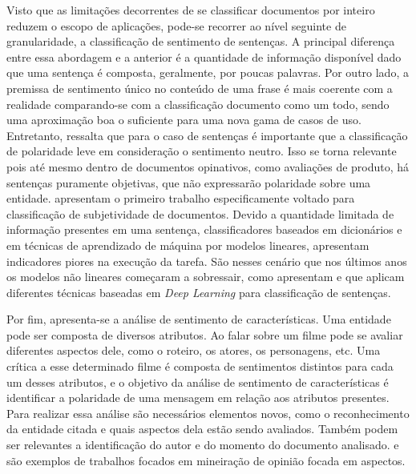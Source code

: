 Visto que as limitações decorrentes de se classificar documentos por inteiro
reduzem o escopo de aplicações, pode-se recorrer ao nível seguinte de
granularidade, a classificação de sentimento de sentenças.
A principal diferença entre essa abordagem e a anterior é a quantidade de
informação disponível dado que uma sentença é composta, geralmente, por poucas
palavras.
Por outro lado, a premissa de sentimento único no conteúdo de uma frase é mais
coerente com a realidade comparando-se com a classificação documento como um
todo, sendo uma aproximação boa o suficiente para uma nova gama de casos de uso.
Entretanto, \citet{liu15} ressalta que para o caso de sentenças é importante que
a classificação de polaridade leve em consideração o sentimento neutro.
Isso se torna relevante pois até mesmo dentro de documentos opinativos, como
avaliações de produto, há sentenças puramente objetivas, que não expressarão
polaridade sobre uma entidade.
\citet{riloff05} apresentam o primeiro trabalho especificamente voltado para
classificação de subjetividade de documentos.
Devido a quantidade limitada de informação presentes em uma sentença,
classificadores baseados em dicionários e em técnicas de aprendizado de máquina
por modelos lineares, apresentam indicadores piores na execução da tarefa.
São nesses cenário que nos últimos anos os modelos não lineares começaram a
sobressair, como apresentam \citet{socher11} e \citet{socher13} que aplicam
diferentes técnicas baseadas em \textit{Deep Learning} para classificação de
sentenças.

Por fim, apresenta-se a análise de sentimento de características.
Uma entidade pode ser composta de diversos atributos.
Ao falar sobre um filme pode se avaliar diferentes aspectos dele, como
o roteiro, os atores, os personagens, etc.
Uma crítica a esse determinado filme é composta de sentimentos distintos para
cada um desses atributos, e o objetivo da análise de sentimento de
características é identificar a polaridade de uma mensagem em relação aos
atributos presentes.
Para realizar essa análise são necessários elementos novos, como o reconhecimento
da entidade citada e quais aspectos dela estão sendo avaliados.
Também podem ser relevantes a identificação do autor e do momento do documento
analisado.
\citet{nasukawa03} e \citet{snyder07} são exemplos de trabalhos focados em
mineiração de opinião focada em aspectos.

